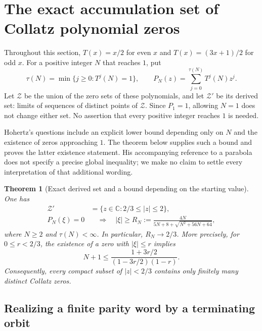\documentclass[11pt,a4paper]{article}
\newtheorem{theorem}{Theorem}[section]
\theoremstyle{definition}
\theoremstyle{remark}
\numberwithin{equation}{section}
\begin{document}
\section{The exact accumulation set of Collatz polynomial zeros}
\label{A:sec:ucz}

Throughout this section, $T(x)=x/2$ for even $x$ and
$T(x)=(3x+1)/2$ for odd $x$. For a positive integer $N$ that reaches $1$, put
\[
 \tau(N)=\min\{j\geq0:T^j(N)=1\},\qquad
 P_N(z)=\sum_{j=0}^{\tau(N)}T^j(N)z^j.
\]
Let $\mathcal Z$ be the union of the zero sets of these polynomials, and
let $\mathcal Z'$ be its derived set: limits of sequences of distinct
points of $\mathcal Z$. Since $P_1=1$, allowing $N=1$ does not change
either set. No assertion that every positive integer reaches $1$ is needed.

Hohertz's questions \cite[Section~5]{R005} include an explicit
lower bound depending only on $N$ and the existence of zeros approaching
$1$. The theorem below supplies such a bound and proves the latter
existence statement. His accompanying reference to a parabola does not
specify a precise global inequality; we make no claim to settle every
interpretation of that additional wording.

\begin{theorem}[Exact derived set and a bound depending on the starting value]
\label{A:thm:ucz-exact}
One has
\begin{align}
 \mathcal Z'&=\{z\in\mathbb C:2/3\leq |z|\leq2\},
 \label{A:eq:ucz-derived}\\
 P_N(\xi)=0&\quad\Longrightarrow\quad
 |\xi|\geq R_N:=
 \frac{4N}{5N+8+\sqrt{N^2+56N+64}},
 \label{A:eq:ucz-N-bound}
\end{align}
where $N\geq2$ and $\tau(N)<\infty$. In particular, $R_N\to2/3$.
More precisely, for $0\leq r<2/3$, the existence of a zero with
$|\xi|\leq r$ implies
\begin{equation}
 N+1\leq\frac{1+3r/2}{(1-3r/2)(1-r)}.
 \label{A:eq:ucz-finite-cutoff}
\end{equation}
Consequently, every compact subset of $|z|<2/3$ contains only finitely
many distinct Collatz zeros.
\end{theorem}

\subsection{Realizing a finite parity word by a terminating orbit}
\end{document}
